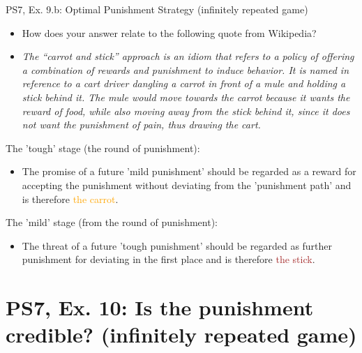 \begin{frame}{PS7, Ex. 9.b: Optimal Punishment Strategy (infinitely repeated game)}
  \begin{itemize}
    \item[(b)] How does your answer relate to the following quote from Wikipedia?
    \item[] \textit{The “carrot and stick” approach is an idiom that refers to a policy of offering a combination of rewards and punishment to induce behavior. It is named in reference to a cart driver dangling a carrot in front of a mule and holding a stick behind it. The mule would move towards the carrot because it wants the reward of food, while also moving away from the stick behind it, since it does not want the punishment of pain, thus drawing the cart.}
  \end{itemize}
  \vspace{-4pt}
  \begin{multicols}{2}
    The 'tough' stage (the  round of punishment):
    \begin{itemize}
      \item The promise of a future 'mild punishment' should be regarded as a reward for accepting the punishment without deviating from the 'punishment path' and is therefore \textcolor{orange}{the carrot}.
    \end{itemize}
    \vfill\null\columnbreak
    The 'mild' stage (from the  round of punishment):
    \begin{itemize}
      \item The threat of a future 'tough punishment' should be regarded as further punishment for deviating in the first place and is therefore \textcolor{brown}{the stick}.
    \end{itemize}
    \vfill\null
  \end{multicols}
\end{frame}



\section{PS7, Ex. 10: Is the punishment credible? (infinitely repeated game)}

